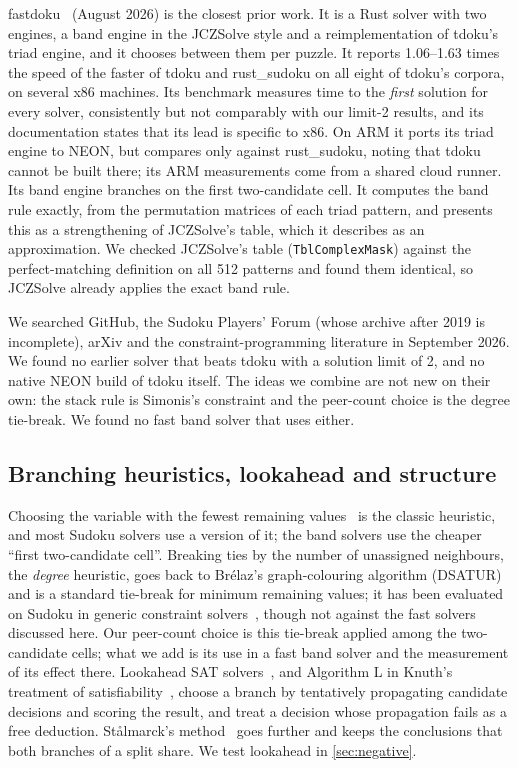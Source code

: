 \documentclass[11pt]{article}
\theoremstyle{definition}
\theoremstyle{plain}
\begin{document}
fastdoku~\cite{rocketbombs2026fastdoku} (August 2026) is the closest prior work. It is a Rust solver with two
engines, a band engine in the JCZSolve style and a reimplementation of tdoku's triad engine, and it chooses between
them per puzzle. It reports 1.06--1.63 times the speed of the faster of tdoku and rust\_sudoku on all eight of tdoku's
corpora, on several x86 machines. Its benchmark measures time to the \emph{first} solution for every solver,
consistently but not comparably with our limit-2 results, and its documentation states that its lead is specific to
x86. On ARM it ports its triad engine to NEON, but compares only against rust\_sudoku, noting that tdoku cannot be
built there; its ARM measurements come from a shared cloud runner. Its band engine branches on the first
two-candidate cell. It computes the band rule exactly, from the permutation matrices of each triad pattern, and
presents this as a strengthening of JCZSolve's table, which it describes as an approximation. We checked JCZSolve's
table (\texttt{TblComplexMask}) against the perfect-matching definition on all 512 patterns and found them identical,
so JCZSolve already applies the exact band rule.

We searched GitHub, the Sudoku Players' Forum (whose archive after 2019 is incomplete), arXiv and the
constraint-programming literature in September 2026. We found no earlier solver that beats tdoku with a solution limit
of 2, and no native NEON build of tdoku itself. The ideas we combine are not new on their own: the stack rule is
Simonis's constraint and the peer-count choice is the degree tie-break. We found no fast band solver that uses either.

\subsection{Branching heuristics, lookahead and structure}

Choosing the variable with the fewest remaining values~\cite{haralick1980increasing} is the classic heuristic, and
most Sudoku solvers use a version of it; the band solvers use the cheaper ``first two-candidate cell''. Breaking ties
by the number of unassigned neighbours, the \emph{degree} heuristic, goes back to Br\'elaz's graph-colouring algorithm
(DSATUR)~\cite{brelaz1979new} and is a standard tie-break for minimum remaining values; it has been evaluated on Sudoku in generic
constraint solvers~\cite{bakker2015generic,liu2026dibs}, though not against the fast solvers discussed here. Our peer-count choice is this
tie-break applied among the two-candidate cells; what we add is its use in a fast band solver and the measurement of
its effect there. Lookahead
SAT solvers~\cite{heule2009lookahead}, and Algorithm L in Knuth's treatment of satisfiability~\cite{knuth2022taocp4b},
choose a branch by tentatively propagating candidate decisions and scoring the result, and treat a decision whose
propagation fails as a free deduction. St\aa lmarck's method~\cite{sheeran2000tutorial} goes further and keeps the
conclusions that both branches of a split share. We test lookahead in \cref{sec:negative}.
\end{document}

